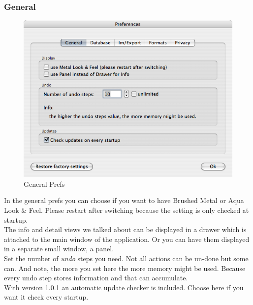 \documentclass[12pt,a4]{article}
\begin{document}
\subsubsection{General}
\label{prefs_general}
\medskip
% 
\begin{figure}[ht]
\begin{center}
\includegraphics[width=13.5cm]{images/Prefs_General.png}
\end{center}
\caption{General Prefs}
\label{image:generalprefs}
\end{figure}
\noindent
%
In the general prefs you can choose if you want to have Brushed Metal or Aqua Look \& Feel. Please restart after switching because the setting is only checked at startup. \\
The info and detail views we talked about can be displayed in a drawer which is attached to the main window of the application. Or you can have them displayed in a separate small window, a panel. \\
Set the number of \textit{undo} steps you need. Not all actions can be un-done but some can. And note, the more you set here the more memory might be used. Because every undo step stores information and that can accumulate. \\
With version 1.0.1 an automatic update checker is included. Choose here if you want it check every startup.
\end{document}
